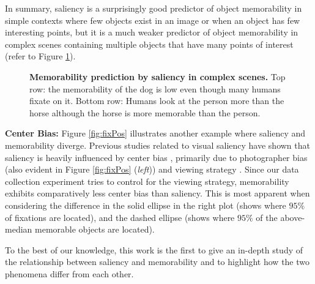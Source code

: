 In summary, saliency is a surprisingly good predictor of object memorability in simple contexts where few objects exist in an image or when an object has few interesting points, but it is a much weaker predictor of object memorability in complex scenes containing multiple objects that have many points of interest (refer to Figure \ref{fig:fixQual}).

\begin{figure}[!htb]
\centering
{}
\vspace{-5mm}\caption{\footnotesize\textbf{Memorability prediction by saliency in complex scenes.} Top row: the memorability of the dog is low even though many humans fixate on it. Bottom row: Humans look at the person more than the horse although the horse is more memorable than the person. }\label{fig:fixQual}
\end{figure}


\vspace{3pt}\noindent\textbf{Center Bias: } Figure \ref{fig:fixPos} illustrates another example where saliency and memorability diverge. Previous studies related to visual saliency have shown that saliency is heavily influenced by center bias \cite{judd09,sun08}, primarily due to photographer bias (also evident in Figure \ref{fig:fixPos} (\emph{left})) and viewing strategy \cite{tseng2009}. Since our data collection experiment tries to control for the viewing strategy, memorability exhibits comparatively less center bias than saliency. This is most apparent when considering the difference in the solid ellipse in the right plot (shows where $95\%$ of fixations are located), and the dashed ellipse (shows where $95\%$ of the above-median memorable objects are located).

To the best of our knowledge, this work is the first to give an in-depth study of the relationship between saliency and memorability and to highlight how the two phenomena differ from each other.


